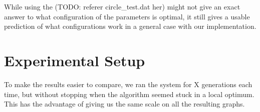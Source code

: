 While using the (TODO: referer circle\_test.dat her) might not give an exact answer to what configuration of the parameters is optimal, it still gives a usable prediction of what configurations work in a general case with our implementation.






\section{Experimental Setup} %
\label{sec:experimental_setup}

To make the results easier to compare, we ran the system for X generations each time, but without stopping when the algorithm seemed stuck in a local optimum. This has the advantage of giving us the same scale on all the resulting graphs.

